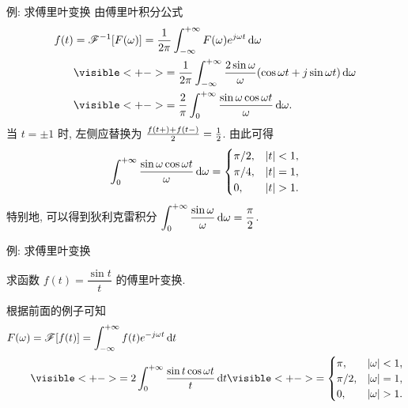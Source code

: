 \begin{frame}{例: 求傅里叶变换}
	\onslide<+->
	由傅里叶积分公式
	\begin{align*}
		f(t)&=\msf^{-1}[F(\omega)]=\frac1{2\pi}\int_{-\infty}^{+\infty}F(\omega)e^{j\omega t}\diff\omega\\
		&\visible<+->{=\frac1{2\pi}\int_{-\infty}^{+\infty}\frac{2\sin\omega}{\omega}(\cos\omega t+j\sin\omega t)\diff \omega}\\
		&\visible<+->{=\frac2\pi\int_0^{+\infty}\frac{\sin\omega\cos\omega t}{\omega}\diff \omega.}
	\end{align*}
	\onslide<+->
	当 $t=\pm1$ 时, 左侧应替换为 $\frac{f(t+)+f(t-)}2=\frac{1}{2} $.
	\onslide<+->
	由此可得
	\[\int_0^{+\infty}\frac{\sin \omega\cos\omega t}\omega\diff\omega=\begin{cases}
		\pi/2,&|t|<1,\\
		\pi/4,&|t|=1,\\
		0,&|t|>1.
	\end{cases}\]
	\onslide<+->
	特别地, 可以得到狄利克雷积分
	$\displaystyle\int_0^{+\infty}\frac{\sin\omega}\omega\,\mathrm{d}\omega=\frac\pi2$.
\end{frame}


\begin{frame}{例: 求傅里叶变换}
	\onslide<+->
	\begin{example}
		求函数 $f(t)=\dfrac{\sin t}{t}$ 的傅里叶变换.
	\end{example}

	\onslide<+->
	\begin{solution}
		根据前面的例子可知
		\vspace{-\baselineskip}
		\begin{align*}
			F(\omega)&=\msf[f(t)]=\int_{-\infty}^{+\infty}f(t)e^{-j\omega t}\diff t\\
			&\visible<+->{=2\int_0^{+\infty}\frac{\sin t\cos\omega t}{t}\diff t}
			\visible<+->{=\begin{cases}
				\pi,&|\omega|<1,\\
				\pi/2,&|\omega|=1,\\
				0,&|\omega|>1.
				\end{cases}}
		\end{align*}
	\end{solution}
\end{frame}


